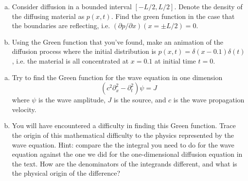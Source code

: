 
\begin{enumerate}[(a)]
  \item Consider diffusion in a bounded interval $[-L/2, L/2]$. Denote the density of the diffusing material as $p(x, t)$. Find the green function in the case that the boundaries are reflecting, i.e. $(\partial p / \partial x)(x=\pm L/2) = 0$.
  \item Using the Green function that you've found, make an animation of the diffusion process where the initial distribution is $p(x, t) = \delta(x-0.1) \delta(t)$, i.e. the material is all concentrated at $x=0.1$ at initial time $t=0$.
\end{enumerate}

\begin{enumerate}[(a)]
  \item Try to find the Green function for the wave equation in one dimension
    \begin{equation}
      \left( c^2 \partial_x^2 - \partial_t^2 \right) \psi = J
    \end{equation}
    where $\psi$ is the wave amplitude, $J$ is the source, and $c$ is the wave propagation velocity.
  \item You will have encountered a difficulty in finding this Green function. Trace the origin of this mathematical difficulty to the physics represented by the wave equation. Hint: compare the the integral you need to do for the wave equation against the one we did for the one-dimensional diffusion equation in the text. How are the denominators of the integrands different, and what is the physical origin of the difference?
\end{enumerate}
